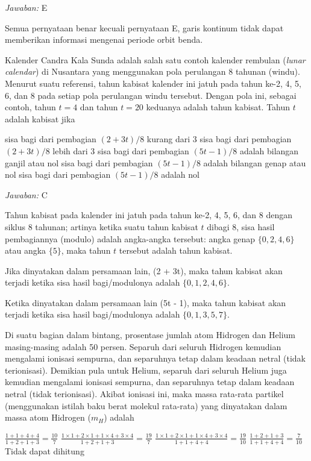 \documentclass[11pt,fleqn]{exam}
\begin{document}
\begin{questions}
\bigskip
\textit{Jawaban: } E

Semua pernyataan benar kecuali pernyataan E, garis kontinum tidak dapat memberikan informasi mengenai periode orbit benda. 


\vspace{0.5cm}
\question Kalender Candra Kala Sunda adalah salah satu contoh kalender rembulan (\textit{lunar calendar}) di Nusantara yang menggunakan pola perulangan 8 tahunan (windu). Menurut suatu referensi, tahun kabisat kalender ini jatuh pada tahun ke-2, 4, 5, 6, dan 8 pada setiap pola perulangan windu tersebut. Dengan pola ini, sebagai contoh, tahun $t = 4$ dan tahun $t = 20$ keduanya adalah tahun kabisat. Tahun $t$ adalah kabisat jika
\begin{choices}
\choice sisa bagi dari pembagian $(2 + 3t)/8$ kurang dari 3
\choice sisa bagi dari pembagian $(2 + 3t)/8$ lebih dari 3
\choice sisa bagi dari pembagian $(5t - 1)/8$ adalah bilangan ganjil atau nol
\choice sisa bagi dari pembagian $(5t - 1)/8$ adalah bilangan genap atau nol
\choice sisa bagi dari pembagian $(5t - 1)/8$ adalah nol
\end{choices}

\bigskip
\textit{Jawaban: } C

Tahun kabisat pada kalender ini jatuh pada tahun ke-2, 4, 5, 6, dan 8 dengan siklus 8 tahunan; artinya ketika suatu tahun kabisat $t$ dibagi 8, sisa hasil pembagiannya  (modulo) adalah angka-angka tersebut: angka genap $\{0, 2, 4, 6 \}$ atau angka $\{5\}$, maka tahun $t$ tersebut adalah tahun kabisat.

Jika dinyatakan dalam persamaan lain, (2 + 3t), maka tahun kabisat akan terjadi ketika sisa hasil bagi/modulonya adalah $\{0, 1, 2, 4, 6\}$. 

Ketika dinyatakan dalam persamaan lain (5t - 1), maka tahun kabisat akan terjadi ketika sisa hasil bagi/modulonya adalah $\{0, 1, 3, 5, 7\}$.


\vspace{0.5cm}
\question Di suatu bagian dalam bintang, prosentase jumlah atom Hidrogen dan Helium masing-masing adalah 50 persen. Separuh dari seluruh Hidrogen kemudian mengalami ionisasi sempurna, dan separuhnya tetap dalam keadaan netral (tidak terionisasi). Demikian pula untuk Helium, separuh dari seluruh Helium juga kemudian mengalami ionisasi sempurna, dan separuhnya tetap dalam keadaan netral (tidak terionisasi). Akibat ionisasi ini, maka massa rata-rata partikel (menggunakan istilah baku berat molekul rata-rata) yang dinyatakan dalam massa atom Hidrogen ($m_H$) adalah
\begin{choices}
\choice $\frac{1+1+4+4}{1+2+1+3} = \frac{10}{7}$
\choice $\frac{1 \times 1 + 2 \times 1 + 1 \times 4 + 3 \times 4}{1+2+1+3} = \frac{19}{7}$
\choice $\frac{1 \times 1 + 2 \times 1 + 1 \times 4 + 3 \times 4}{1+1+4+4} = \frac{19}{10}$
\choice $\frac{1+2+1+3}{1+1+4+4} = \frac{7}{10}$
\choice Tidak dapat dihitung
\end{choices}


\end{questions}
\end{document}
